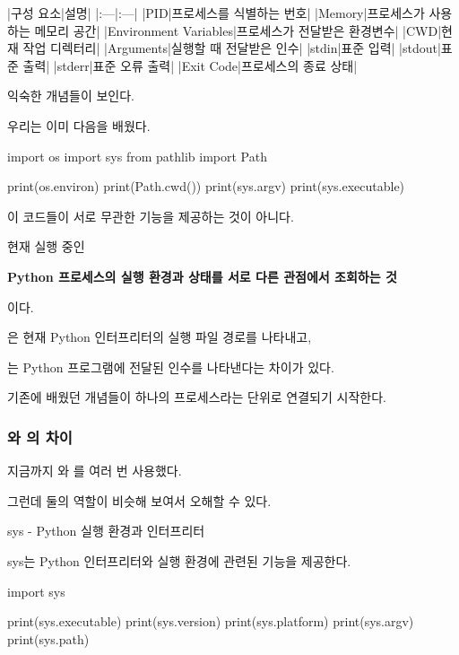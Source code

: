 \begin{dhktable}
|구성 요소|설명|
|:---|:---|
|PID|프로세스를 식별하는 번호|
|Memory|프로세스가 사용하는 메모리 공간|
|Environment Variables|프로세스가 전달받은 환경변수|
|CWD|현재 작업 디렉터리|
|Arguments|실행할 때 전달받은 인수|
|stdin|표준 입력|
|stdout|표준 출력|
|stderr|표준 오류 출력|
|Exit Code|프로세스의 종료 상태|
\end{dhktable}

익숙한 개념들이 보인다.

우리는 이미 다음을 배웠다.

\begin{dhkcode}
import os
import sys
from pathlib import Path

print(os.environ)
print(Path.cwd())
print(sys.argv)
print(sys.executable)
\end{dhkcode}

이 코드들이 서로 무관한 기능을 제공하는 것이 아니다.

현재 실행 중인
\begin{dhksmry}[centered]
\textbf{Python 프로세스의 실행 환경과 상태를 서로 다른 관점에서 조회하는 것}
\end{dhksmry}

이다.

은 현재 Python 인터프리터의 실행 파일 경로를 나타내고,

는 Python 프로그램에 전달된 인수를 나타낸다는 차이가 있다.

기존에 배웠던 개념들이 하나의 프로세스라는 단위로 연결되기 시작한다.

\subsubsection{와 의 차이}

지금까지 와 를 여러 번 사용했다.

그런데 둘의 역할이 비슷해 보여서 오해할 수 있다.

\begin{dhknote}
\begin{dhksmry}[centered]
sys - Python 실행 환경과 인터프리터
\end{dhksmry}

\begin{dhksmry}
sys는 Python 인터프리터와 실행 환경에 관련된 기능을 제공한다.
\end{dhksmry}
\end{dhknote}

\begin{dhkcode}
import sys

print(sys.executable)
print(sys.version)
print(sys.platform)
print(sys.argv)
print(sys.path)
\end{dhkcode}

